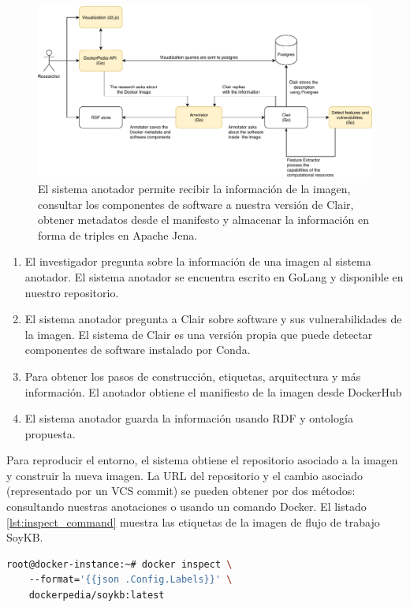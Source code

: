 \begin{figure}[]
\includegraphics[width=\textwidth]{Figures/arch.pdf}
\caption{El sistema anotador permite recibir la información de la imagen, consultar los componentes de software a nuestra versión de Clair, obtener metadatos desde el manifesto y almacenar la información en forma de triples en Apache Jena.}\label{fig:arch}
\end{figure}


\begin{enumerate}
    \item El investigador pregunta sobre la información de una imagen al sistema anotador. El sistema anotador se encuentra escrito en GoLang y disponible en nuestro repositorio.
    \item El sistema anotador pregunta a Clair sobre software y sus vulnerabilidades de la imagen. El sistema de Clair es una versión propia que puede detectar componentes de software instalado por Conda.
    \item Para obtener los pasos de construcción, etiquetas, arquitectura y más información. El anotador obtiene el manifiesto de la imagen desde DockerHub
    \item El sistema anotador guarda la información usando RDF y ontología propuesta.
\end{enumerate}


Para reproducir el entorno, el sistema obtiene el repositorio asociado a la imagen y construir la nueva imagen. La URL del repositorio y el cambio asociado (representado por un VCS commit) se pueden obtener por dos métodos: consultando nuestras anotaciones o usando un comando Docker. El listado \ref{lst:inspect_command} muestra las etiquetas de la imagen de flujo de trabajo SoyKB.


\begin{lstlisting}[caption={Inspect image annotations},label={lst:inspect_command},language=bash]
root@docker-instance:~# docker inspect \ 
    --format='{{json .Config.Labels}}' \ 
    dockerpedia/soykb:latest
\end{lstlisting}

